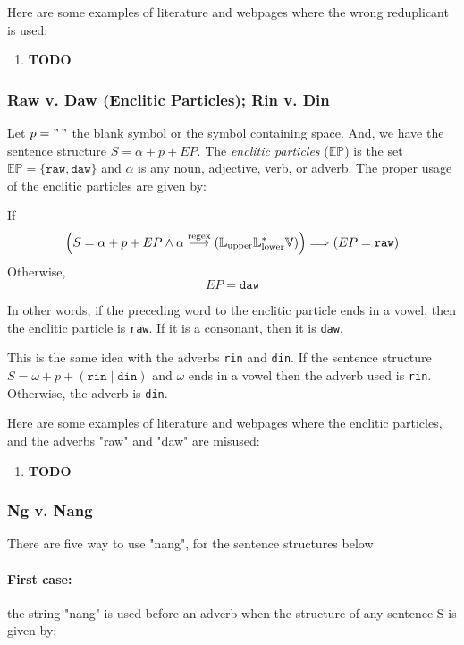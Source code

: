 \begin{example}
      Here are some examples of literature and webpages where the wrong reduplicant is
      used:
\end{example}
\begin{enumerate}
      \item \textbf{TODO}
\end{enumerate}

\subsubsection{Raw v. Daw (Enclitic Particles); Rin v. Din}

Let \(p = "\,"\) the blank symbol or the symbol containing space. And, we have the
sentence structure \(S = \alpha + p + EP\). The \textit{enclitic particles}
(\(\mathbb{EP}\)) is the set \(\mathbb{EP} = \{\texttt{raw}, \texttt{daw}\}\) and
\(\alpha\) is any noun, adjective, verb, or adverb. The proper usage of the enclitic
particles are given by:

If
\[
    \left( S = \alpha + p + EP \land \alpha \overset{\text{regex}}{\longrightarrow} (\mathbb{L}_\text{upper}\mathbb{L}_\text{lower}^*\mathbb{V}) \right)
    \Longrightarrow 
    \left( EP = \texttt{raw} \right)
\]
Otherwise,
\[
      EP = \texttt{daw}
\]

In other words, if the preceding word to the enclitic particle ends in a vowel,
then the enclitic particle is \texttt{raw}. If it is a consonant, then it is \texttt{daw}.

This is the same idea with the adverbs \texttt{rin} and \texttt{din}. If the sentence structure
\(S = \omega + p + (\texttt{rin}\mid\texttt{din})\) and \(\omega\) ends in a vowel
then the adverb used is \texttt{rin}. Otherwise, the adverb is \texttt{din}.

Here are some examples of literature and webpages where the enclitic particles,
and the adverbs "raw" and "daw" are misused:
\begin{enumerate}
      \item \textbf{TODO}
\end{enumerate}

\subsubsection{Ng v. Nang}

There are five way to use "nang", for the sentence structures below

\paragraph{First case:} the string "nang" is used before an adverb when the
structure of any sentence S is given by:


